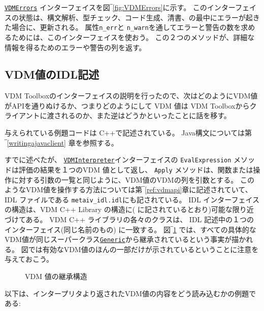 \documentclass[\pformat,12pt]{jarticle}
\newcommand{\Generic}{\hyperlink{interface.Generic}{Generic}}
\newcommand{\VDMErrors}{\hyperlink{interface.VDMErrors}{VDMErrors}}
\newcommand{\VDMInterpreter}{\hyperlink{interface.VDMInterpreter}{VDMInterpreter}}
\begin{document}
 {\tt \VDMErrors} インターフェイスを図‾\ref{fig:VDMErrors}に示す。
このインターフェイスの状態は、構文解析、型チェック、コード生成、清書、の最中にエラーが起きた場合に、更新される。
属性{\tt n\_err}と {\tt n\_warn}を通してエラーと警告の数を求めるためには、このインターフェイスを使おう。
この２つのメソッドが、詳細な情報を得るためのエラーや警告の列を返す。

\subsection{VDM値のIDL記述}
\label{idldescriptionvalues}

 VDM Toolboxのインターフェイスの説明を行ったので、次はどのようにVDM値がAPIを通りぬけるか、つまりどのようにして VDM 値は VDM Toolboxからクライアントに渡されるのか、また逆はどうかといったことに話を移す。

与えられている例題コードは C++で記述されている。
Java構文については第‾\ref{writingajavaclient} 章を参照する。

すでに述べたが、 {\tt  \VDMInterpreter}インターフェイスの {\tt EvalExpression} メソッドは評価の結果を１つのVDM 値として返し、 {\tt Apply} メソッドは、関数または操作に対する引数の一覧と同じように、VDM値のVDMの列を引数とする。
このようなVDM値を操作する方法については第‾\ref{ref:vdmapi}章に記述されていて、IDL ファイルである {\tt metaiv\_idl.idl}にも記されている。
 IDL インターフェイスの構造は、VDM C++ Library の構造に( \cite{LibMan-CSK}に記されているとおり)可能な限り近づけてある。
VDM C++ ライブラリの各々のクラスは、 IDL 記述中の１つのインターフェイス(同じ名前のもの) に一致する。 
図‾\ref{fig:VDMvalues} では、すべての具体的なVDM値が同じスーパークラス{\tt  \Generic}から継承されているという事実が描かれる。
図では有効なVDM値のほんの一部だけが示されているということに注意を与えておこう。

\begin{figure}[tbh]
\begin{center}
\mbox{}
\caption{VDM 値の継承構造}\label{fig:VDMvalues}
\end{center}
\end{figure}

以下は、インタープリタより返されたVDM値の内容をどう読み込むかの例題である:
\end{document}
